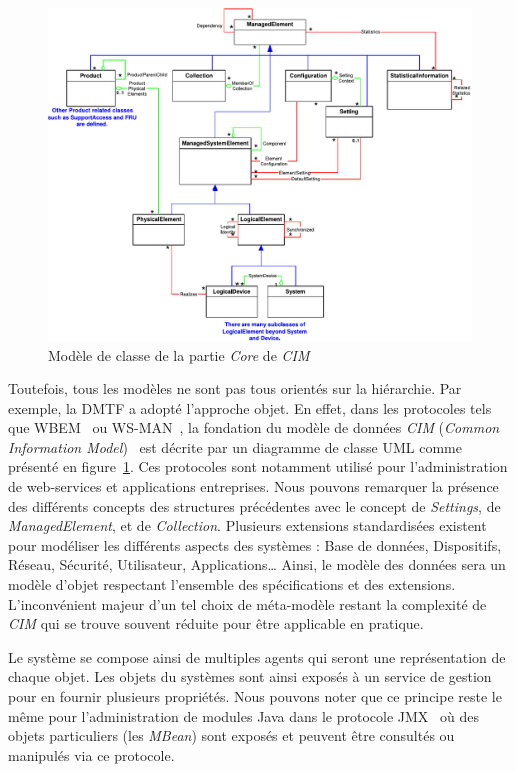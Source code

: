 \begin{figure}[ht]
    \centering
    \includegraphics[width=.75\textwidth]{fig/rw-supervision-cimcore}
    \caption{Modèle de classe de la partie \textit{Core} de \textit{CIM}}\label{fig:rw:supervision:cimcore}
\end{figure}
Toutefois, tous les modèles ne sont pas tous orientés sur la hiérarchie. Par exemple, la DMTF a adopté l'approche objet. En effet, dans les protocoles tels que WBEM~\cite{DMTF:WBEM} ou WS-MAN~\cite{DMTF:WS-MAN}, la fondation du modèle de données \textit{CIM} (\textit{Common Information Model})~\cite{DMTF:CIM} est décrite par un diagramme de classe UML comme présenté en figure~\ref{fig:rw:supervision:cimcore}. Ces protocoles sont notamment utilisé pour l'administration de web-services et applications entreprises. Nous pouvons remarquer la présence des différents concepts des structures précédentes avec le concept de \textit{Settings}, de \textit{ManagedElement}, et de \textit{Collection}. Plusieurs extensions standardisées existent pour modéliser les différents aspects des systèmes : Base de données, Dispositifs, Réseau, Sécurité, Utilisateur, Applications\dots{} Ainsi, le modèle des données sera un modèle d'objet respectant l'ensemble des spécifications et des extensions. L'inconvénient majeur d'un tel choix de méta-modèle restant la complexité de \textit{CIM} qui se trouve souvent réduite pour être applicable en pratique.

Le système se compose ainsi de multiples agents qui seront une représentation de chaque objet. Les objets du systèmes sont ainsi exposés à un service de gestion pour en fournir plusieurs propriétés. Nous pouvons noter que ce principe reste le même pour l'administration de modules Java dans le protocole JMX~\cite{Sun:JMX} où des objets particuliers (les \textit{MBean}) sont exposés et peuvent être consultés ou manipulés via ce protocole.

